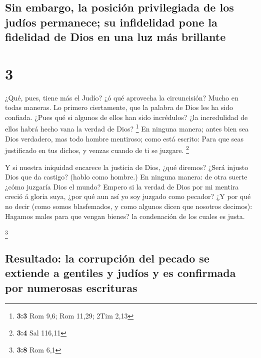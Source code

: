 \hypertarget{sin-embargo-la-posiciuxf3n-privilegiada-de-los-juduxedos-permanece-su-infidelidad-pone-la-fidelidad-de-dios-en-una-luz-muxe1s-brillante}{%
\subsection{Sin embargo, la posición privilegiada de los judíos
permanece; su infidelidad pone la fidelidad de Dios en una luz más
brillante}\label{sin-embargo-la-posiciuxf3n-privilegiada-de-los-juduxedos-permanece-su-infidelidad-pone-la-fidelidad-de-dios-en-una-luz-muxe1s-brillante}}

\hypertarget{section-2}{%
\section{3}\label{section-2}}

 ¿Qué, pues, tiene más el Judío? ¿ó qué aprovecha la
circuncisión?  Mucho en todas maneras. Lo primero
ciertamente, que la palabra de Dios les ha sido confiada. 
¿Pues qué si algunos de ellos han sido incrédulos? ¿la incredulidad de
ellos habrá hecho vana la verdad de Dios? \footnote{\textbf{3:3} Rom
  9,6; Rom 11,29; 2Tim 2,13}  En ninguna manera; antes
bien sea Dios verdadero, mas todo hombre mentiroso; como está escrito:
Para que seas justificado en tus dichos, y venzas cuando de ti se
juzgare. \footnote{\textbf{3:4} Sal 116,11}

 Y si nuestra iniquidad encarece la justicia de Dios, ¿qué
diremos? ¿Será injusto Dios que da castigo? (hablo como hombre.)
 En ninguna manera: de otra suerte ¿cómo juzgaría Dios el
mundo?  Empero si la verdad de Dios por mi mentira creció
á gloria suya, ¿por qué aun así yo soy juzgado como pecador?
 ¿Y por qué no decir (como somos blasfemados, y como
algunos dicen que nosotros decimos): Hagamos males para que vengan
bienes? la condenación de los cuales es justa.

\footnote{\textbf{3:8} Rom 6,1}

\hypertarget{resultado-la-corrupciuxf3n-del-pecado-se-extiende-a-gentiles-y-juduxedos-y-es-confirmada-por-numerosas-escrituras}{%
\subsection{Resultado: la corrupción del pecado se extiende a gentiles y
judíos y es confirmada por numerosas
escrituras}\label{resultado-la-corrupciuxf3n-del-pecado-se-extiende-a-gentiles-y-juduxedos-y-es-confirmada-por-numerosas-escrituras}}

